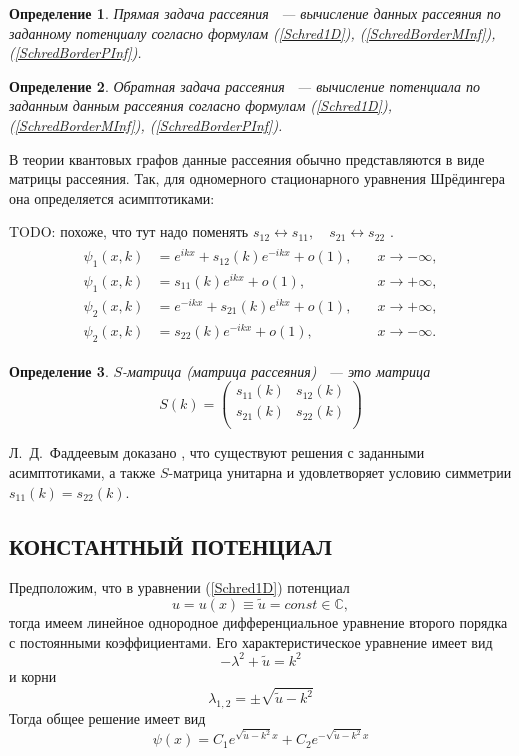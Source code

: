 \documentclass[a4 paper, 12 pt]{extarticle}
\newtheorem{Def}{Определение}[section]
\begin{document}
   \begin{Def}
   	Прямая задача рассеяния ~--- вычисление данных рассеяния по заданному потенциалу согласно формулам (\ref{Schred1D}), (\ref{SchredBorderMInf}), (\ref{SchredBorderPInf}).
   \end{Def}

   \begin{Def}
   	Обратная задача рассеяния ~--- вычисление потенциала по заданным данным рассеяния согласно формулам (\ref{Schred1D}), (\ref{SchredBorderMInf}), (\ref{SchredBorderPInf}).
   \end{Def}

   В теории квантовых графов данные рассеяния обычно представляются в виде матрицы рассеяния. Так, для одномерного стационарного уравнения Шрёдингера она определяется асимптотиками:
   
   TODO: похоже, что тут надо поменять $s_{12} \leftrightarrow s_{11}, \quad s_{21} \leftrightarrow s_{22}$ .
   \begin{gather*}
   \begin{aligned}
   \psi_1(x,k)&=e^{ikx}+s_{12}(k)e^{-ikx}+o(1), \quad &x\rightarrow-\infty,\\
   \psi_1(x,k)&=s_{11}(k)e^{ikx}+o(1), \quad &x\rightarrow+\infty,\\
   \psi_2(x,k)&=e^{-ikx}+s_{21}(k)e^{ikx}+o(1), \quad &x\rightarrow+\infty,\\
   \psi_2(x,k)&=s_{22}(k)e^{-ikx}+o(1), \quad &x\rightarrow-\infty.
   \end{aligned}
   \end{gather*}
   

   \begin{Def}
   	$S$-матрица (матрица рассеяния) ~--- это матрица 
    \begin{equation}\label{DSM}
    S(k)=\left(%
    \begin{array}{cc}
    s_{11}(k) & s_{12}(k) \\
    s_{21}(k) & s_{22}(k) \\
    \end{array}%
    \right)
    \end{equation}
   \end{Def}

   Л.~Д.~Фаддеевым доказано \cite{SMatrix}, что существуют решения с заданными асимптотиками, а также $S$-матрица унитарна и удовлетворяет условию симметрии $s_{11}\left(k\right) = s_{22}\left(k\right)$.
   
   \subsection{КОНСТАНТНЫЙ ПОТЕНЦИАЛ}
   Предположим, что в уравнении (\ref{Schred1D}) потенциал $$u = u\left(x\right) \equiv \tilde{u} = const \in \mathbb{C},$$ тогда имеем линейное однородное дифференциальное уравнение второго порядка с постоянными коэффициентами. Его характеристическое уравнение имеет вид
   \[-\lambda^2+\tilde{u} = k^2\]
   и корни
   \[\lambda_{1,2}=\pm \sqrt{\tilde{u}-k^2}\]
   Тогда общее решение имеет вид
   \[
   \psi\left(x\right)= C_1 e^{\sqrt{\tilde{u}-k^2}x} + C_2 e^{-\sqrt{\tilde{u}-k^2}x}
   \]
   
\end{document}
